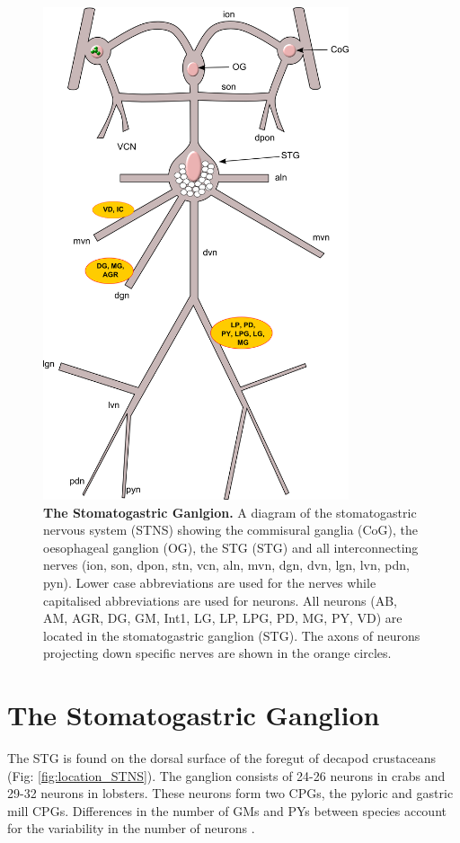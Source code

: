 \begin{figure}[H]
	\centering
		\includegraphics[width=9cm]{graphics/STNS.png}
		\caption[The stomatogastric ganglion.]{\textbf{The Stomatogastric Ganlgion.} A diagram of the stomatogastric nervous system (STNS) showing the commisural ganglia (CoG), the oesophageal ganglion (OG), the \ac{STG} (STG) and all interconnecting nerves (ion, son, dpon, stn, vcn, aln, mvn, dgn, dvn, lgn, lvn, pdn, pyn). Lower case abbreviations are used for the nerves while capitalised abbreviations are used for neurons. All neurons (AB, AM, AGR, DG, GM, Int1, LG, LP, LPG, PD, MG, PY, VD) are located in the stomatogastric ganglion (STG). The axons of neurons projecting down specific nerves are shown in the orange circles. }
		\label{fig:STNS}
\end{figure}

\section{The Stomatogastric Ganglion}

The \ac{STG} is found on the dorsal surface of the foregut of decapod crustaceans (Fig: \ref{fig:location_STNS}). The ganglion consists of 24-26 neurons in crabs and 29-32 neurons in lobsters. These neurons form two \acp{CPG}, the pyloric and gastric mill \acp{CPG}. Differences in the number of \acp{GM} and \acp{PY} between species account for the variability in the number of neurons \cite{Marder2007}.

